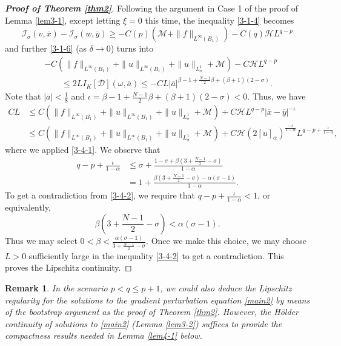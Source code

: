 \documentclass[11pt,reqno]{amsart}
\numberwithin{equation}{section}
\newtheorem{remark}[theorem]{Remark}
\begin{document}
\begin{proof}[\textbf{Proof of Theorem \ref{thm2}}]
Following the argument in Case 1 of the proof of Lemma \ref{lem3-1}, except letting $\xi=0$ this time, the inequality \eqref{3-1-4} becomes
$$
\mathcal{I}_\sigma(v,\overline{x})-\mathcal{I}_\sigma(w,\overline{y})\ge -C(p)(\mathcal{M}+\|f\|_{L^\infty(B_1)})-C(q)\mathcal{H}L^{q-p}
$$
and further \eqref{3-1-6} (as $\delta\rightarrow0$) turns into
\begin{align*}
&-C(\|f\|_{L^\infty(B_1)}+\|u\|_{L^\infty(B_1)}+\|u\|_{L^1_\sigma}+\mathcal{M})-C\mathcal{H}L^{q-p}\\
&\qquad\le 2LI_K[\mathcal{D}](\omega,\overline{a})
\le -CL|\overline{a}|^{\beta-1+\frac{N-1}{2}\beta+(\beta+1)(2-\sigma)}.
\end{align*}
Note that $|\overline{a}|<\frac{1}{8}$ and $\iota=\beta-1+\frac{N-1}{2}\beta+(\beta+1)(2-\sigma)<0$. Thus, we have
 \begin{equation}
\label{3-4-2}
\begin{split}
CL&\le C(\|f\|_{L^\infty(B_1)}+\|u\|_{L^\infty(B_1)}+\|u\|_{L^1_\sigma}+\mathcal{M})+C\mathcal{H}L^{q-p}|\overline{x}-\overline{y}|^{-\iota} \\
&\le C(\|f\|_{L^\infty(B_1)}+\|u\|_{L^\infty(B_1)}+\|u\|_{L^1_\sigma}+\mathcal{M})+C\mathcal{H}(2[u]_\alpha)^\frac{-\iota}{1-\alpha}
L^{q-p+\frac{\iota}{1-\alpha}},
\end{split}
\end{equation}
where we applied \eqref{3-4-1}. We observe that
\begin{align*}
q-p+\frac{\iota}{1-\alpha}&\le \sigma+\frac{1-\sigma+\beta\left(3+\frac{N-1}{2}-\sigma\right)}{1-\alpha}\\
&=1+\frac{\beta\left(3+\frac{N-1}{2}-\sigma\right)-\alpha(\sigma-1)}{1-\alpha}.
\end{align*}
To get a contradiction from \eqref{3-4-2}, we require that $q-p+\frac{\iota}{1-\alpha}<1$, or equivalently,
$$
\beta\left(3+\frac{N-1}{2}-\sigma\right)<\alpha(\sigma-1).
$$
Thus we may select $0<\beta<\frac{\alpha(\sigma-1)}{3+\frac{N-1}{2}-\sigma}$.
Once we make this choice, we may choose $L>0$ sufficiently large in the inequality \eqref{3-4-2} to get a contradiction.
This proves the Lipschitz continuity.
\end{proof}

\begin{remark}
In the scenario $p<q\le p+1$, we could also deduce the Lipschitz regularity for the solutions to the gradient perturbation equation \eqref{main2} by means of the bootstrap argument as the proof of Theorem \ref{thm2}. However, the H\"{o}lder continuity of solutions to \eqref{main2} (Lemma \ref{lem3-2}) suffices to provide the compactness results needed in Lemma \ref{lem4-1} below.
\end{remark}
\end{document}
